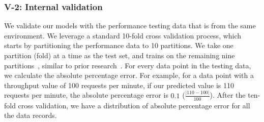 
\subsubsection{V-2: Internal validation}

We validate our models with the performance testing data that is from the same environment. We leverage a standard 10-fold cross validation process, which starts by partitioning the performance data to 10 partitions. We take one partition (fold) at a time as the test set, and trains on the remaining nine partitions~\cite{10foldcross,kohavi1995study}, similar to prior research~\cite{haroon}. For every data point in the testing data, we calculate the absolute percentage error. For example, for a data point with a throughput value of 100 requests per minute, if our predicted value is 110 requests per minute, the absolute percentage error is $0.1$ ($\frac{|110-100|}{100}$). After the ten-fold cross validation, we have a distribution of absolute percentage error for all the data records.



